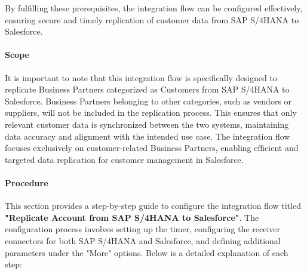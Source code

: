 By fulfilling these prerequisites, the integration flow can be configured effectively, ensuring secure and timely replication of customer data from SAP S/4HANA to Salesforce.


\paragraph{Scope}
It is important to note that this integration flow is specifically designed to replicate Business Partners categorized as Customers from SAP S/4HANA to Salesforce. Business Partners belonging to other categories, such as vendors or suppliers, will not be included in the replication process. This ensures that only relevant customer data is synchronized between the two systems, maintaining data accuracy and alignment with the intended use case. The integration flow focuses exclusively on customer-related Business Partners, enabling efficient and targeted data replication for customer management in Salesforce.

\paragraph{Procedure } 

This section provides a step-by-step guide to configure the integration flow titled \textbf{"Replicate Account from SAP S/4HANA to Salesforce"}. The configuration process involves setting up the timer, configuring the receiver connectors for both SAP S/4HANA and Salesforce, and defining additional parameters under the "More" options. Below is a detailed explanation of each step:


